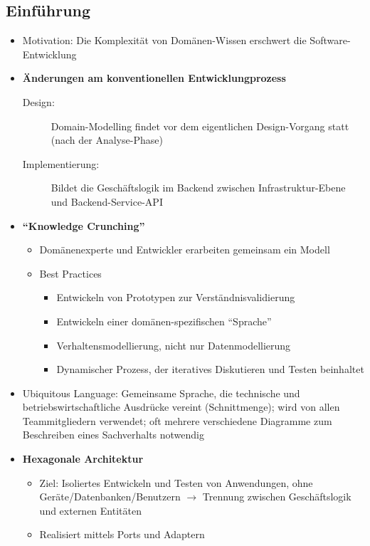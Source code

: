 \subsection{Einführung}
\begin{itemize}
	\item Motivation: Die Komplexität von Domänen-Wissen erschwert die Software-Entwicklung
	\item \textbf{Änderungen am konventionellen Entwicklungprozess}
	\begin{description}
		\item[Design:] Domain-Modelling findet vor dem eigentlichen Design-Vorgang statt (nach der Analyse-Phase)
		\item[Implementierung:] Bildet die Geschäftslogik im Backend zwischen Infrastruktur-Ebene und Backend-Service-API
	\end{description}
	\item \textbf{"`Knowledge Crunching"'}
	\begin{itemize}
		\item Domänenexperte und Entwickler erarbeiten gemeinsam ein Modell
		\item Best Practices
		\begin{itemize}
			\item Entwickeln von Prototypen zur Verständnisvalidierung
			\item Entwickeln einer domänen-spezifischen "`Sprache"'
			\item Verhaltensmodellierung, nicht nur Datenmodellierung
			\item Dynamischer Prozess, der iteratives Diskutieren und Testen beinhaltet
		\end{itemize}
	\end{itemize}
	\item Ubiquitous Language: Gemeinsame Sprache, die technische und betriebswirtschaftliche Ausdrücke vereint (Schnittmenge); wird von allen Teammitgliedern verwendet; oft mehrere verschiedene Diagramme zum Beschreiben eines Sachverhalts notwendig
	\item \textbf{Hexagonale Architektur}
	\begin{itemize}
		\item Ziel: Isoliertes Entwickeln und Testen von Anwendungen, ohne Geräte/Datenbanken/Benutzern \(\rightarrow\) Trennung zwischen Geschäftslogik und externen Entitäten
		\item Realisiert mittels Ports und Adaptern
	\end{itemize}
\end{itemize}


